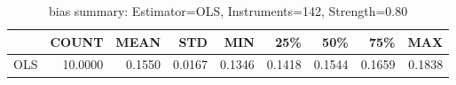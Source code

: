 \begin{table}[ht]
\centering
\caption{bias summary: Estimator=OLS, Instruments=142, Strength=0.80}
\begin{tabular}{lrrrrrrrr}
\toprule
 & COUNT & MEAN & STD & MIN & 25\% & 50\% & 75\% & MAX \\
\midrule
OLS & 10.0000 & 0.1550 & 0.0167 & 0.1346 & 0.1418 & 0.1544 & 0.1659 & 0.1838 \\
\bottomrule
\end{tabular}
\end{table}
